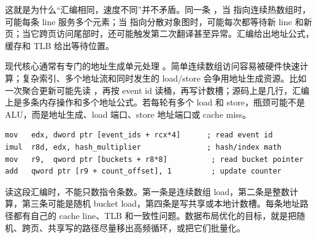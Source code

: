 这就是为什么“汇编相同，速度不同”并不矛盾。同一条 ，当  指向连续热数组时，可能每条 line 服务多个元素；当  指向分散对象图时，可能每次都等待新 line 和新页；当它跨页访问尾部时，还可能触发第二次翻译甚至异常。汇编给出地址公式，缓存和 TLB 给出等待位置。

现代核心通常有专门的地址生成单元处理 。简单连续数组访问容易被硬件快速计算；复杂索引、多个地址流和同时发生的 load/store 会争用地址生成资源。比如一次聚合更新可能先读 ，再按 event id 读桶，再写计数槽；源码上是几行，汇编上是多条内存操作和多个地址公式。若每轮有多个 load 和 store，瓶颈可能不是 ALU，而是地址生成、load 端口、store 地址端口或 cache miss。

\begin{lstlisting}[numbers=none,caption={一次哈希更新可能展开成多条地址路径}]
mov   edx, dword ptr [event_ids + rcx*4]      ; read event id
imul  r8d, edx, hash_multiplier               ; hash/index math
mov   r9,  qword ptr [buckets + r8*8]          ; read bucket pointer
add   qword ptr [r9 + count_offset], 1         ; update counter
\end{lstlisting}

读这段汇编时，不能只数指令条数。第一条是连续数组 load，第二条是整数计算，第三条可能是随机 bucket load，第四条是写共享或本地计数槽。每条地址路径都有自己的 cache line、TLB 和一致性问题。数据布局优化的目标，就是把随机、跨页、共享写的路径尽量移出高频循环，或把它们批量化。

